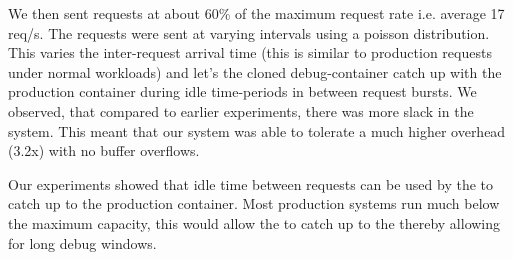 We then sent requests at about 60\% of the maximum request rate i.e. average 17 req/s. 
The requests were sent at varying intervals using a poisson distribution. 
This varies the inter-request arrival time (this is similar to production requests under normal workloads) and let's the cloned debug-container catch up with the production container during idle time-periods in between request bursts.
We observed, that compared to earlier experiments, there was more slack in the system. 
This meant that our system was able to tolerate a much higher overhead (3.2x) with no buffer overflows.

Our experiments showed that idle time between requests can be used by the \debugcontainer to catch up to the production container. 
Most production systems run much below the maximum capacity, this would allow the \debugcontainer to catch up to the \productioncontainer thereby allowing for long debug windows.

